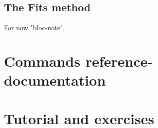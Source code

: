 













\COM
{
\chapter{The Fits method}

For now "bloc-note",

}


\part{Commands reference-documentation}







\part{Tutorial and exercises}

